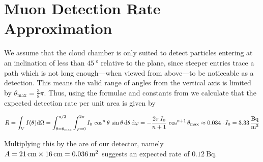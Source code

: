 \documentclass[10pt,a4paper]{article}
\begin{document}
\appendix
\section{Muon Detection Rate Approximation}\label{appdx:muon-detection-rate}
We assume that the cloud chamber is only suited to detect particles entering at an inclination of less than $\qty{45}{\degree}$ relative to the plane, since steeper entries trace a path which is not long enough---when viewed from above---to be noticeable as a detection. This means the valid range of angles from the vertical axis is limited by $\theta_{\max} = \frac{3}{8}\pi$. Thus, using the formulae and constants from \cite{MuonEnergies} we calculate that the expected detection rate per unit area is given by

$$
R = \int_V I(\theta) \mathrm d\Omega  
 = \int_{\theta=\theta_{\max}}^{\pi/2}\int_{\varphi=0}^{2\pi} I_0\,\cos^n\theta\,\sin\theta\,\mathrm d\theta\,\mathrm d\varphi = - \frac{2\pi\,I_0}{n + 1}\,\cos^{n + 1}\theta_{\max} \approx 0.034\cdot I_0 = \qty{3.33}{\frac{\becquerel}{\meter^2}}
$$


Multiplying this by the are of our detector, namely $A=  \qtyproduct{21 x 16}{\centi\meter} = \qty{0.036}{\meter^2}$ suggests an expected rate of $\qty{0.12}{\becquerel}$.
\end{document}
